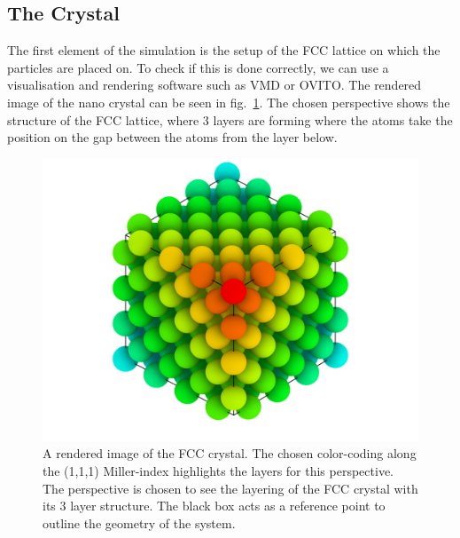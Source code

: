 \documentclass[12pt]{article}
\begin{document}
\subsection{The Crystal}
The first element of the simulation is the setup of the FCC lattice on which the particles are placed on. To check if this is done correctly, we can
use a visualisation and rendering software such as VMD\cite{Humphrey1996} or OVITO\cite{Stukowski2010}. The rendered image of the nano crystal 
can be seen in fig.~\ref{fig:glass}. The chosen perspective shows the structure of the FCC lattice, where 3 layers are forming 
where the atoms take the position on the gap between the atoms from the layer below.\\
\begin{figure}[h]
    \begin{center}
        \includegraphics[scale=0.2]{images/fcc_rendering_layer_newcoloring.png}
        \caption{A rendered image of the FCC crystal. The chosen color-coding along the (1,1,1) Miller-index 
                highlights the layers for this perspective. The perspective is
                chosen to see the layering of the FCC crystal with its 3 layer structure. The black box acts as a reference point to outline the 
                geometry of the system.}
        \label{fig:glass}
    \end{center}
\end{figure}
\end{document}
